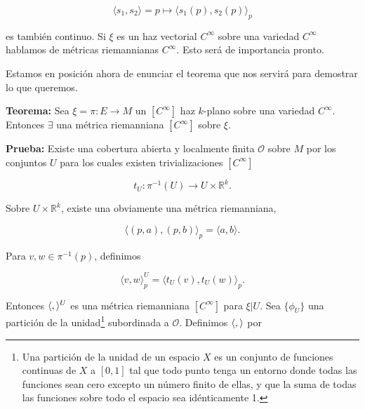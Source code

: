 \documentclass[a4paper,10pt]{article}
\numberwithin{equation}{section}
\newcommand{\teorema}{\textbf{Teorema: }}
\newcommand{\prueba}{\textbf{Prueba: }}
\begin{document}
\begin{equation}
 \langle s_1, s_2 \rangle = p \mapsto \langle s_1(p), s_2(p) \rangle_p
\end{equation}

es también continuo. Si $\xi$ es un haz vectorial $C^\infty$ sobre una variedad 
$C^\infty$ hablamos de métricas riemannianas $C^\infty$. Esto será de importancia pronto.

\vspace{.3cm}

Estamos en posición ahora de enunciar el teorema que nos servirá para 
demostrar lo que queremos.

\vspace{.3cm}

\teorema Sea $\xi = \pi: E \rightarrow M$ un $[C^\infty]$ haz $k$-plano
sobre una variedad $C^\infty$. Entonces $\exists$ una métrica riemanniana 
$[C^\infty]$ sobre $\xi$.

\vspace{.3cm}

\prueba Existe una cobertura abierta y localmente finita $\mathcal{O}$ sobre 
$M$ por los conjuntos $U$ para los cuales existen trivializaciones $[C^\infty]$

\begin{equation}
 t_U: \pi^{-1}(U) \rightarrow U \times \mathbb{R}^k.
\end{equation}

Sobre $U \times \mathbb{R}^k$, existe una obviamente una métrica riemanniana,

\begin{equation}
 \langle (p,a), (p,b)\rangle_p = \langle a, b \rangle. 
\end{equation}

Para $v,w \in \pi^{-1}(p)$, definimos

\begin{equation}
 \langle v, w \rangle_p^U = \langle t_U(v),t_U(w)\rangle_p.
\end{equation}

Entonces $\langle \space , \space \rangle^U$ es una métrica riemanniana
$[C^\infty]$ para $\xi|U$. Sea $\{\phi_U \}$ una partición de la unidad\footnote{ Una partición 
de la unidad de un espacio $X$ es un conjunto de funciones continuas de $X$ a $[0,1]$ tal que todo punto 
tenga un entorno donde todas las funciones sean cero excepto un número finito de ellas, y que la 
suma de todas las funciones sobre todo el espacio sea idénticamente 1.} 
subordinada a $\mathcal{O}$. Definimos $\langle \space, \space \rangle$ por 
\end{document}
